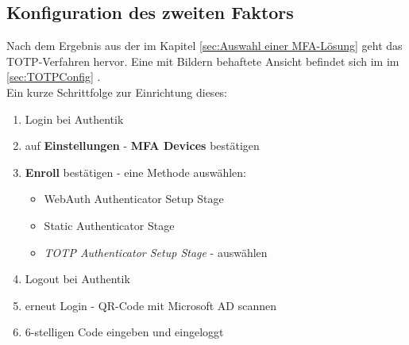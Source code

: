 \subsection{Konfiguration des zweiten Faktors}
\label{sec:Konfiguration des zweiten Faktors}
Nach dem Ergebnis aus der  im Kapitel \ref{sec:Auswahl einer MFA-Lösung}  
geht das \acs{TOTP}-Verfahren hervor. Eine mit Bildern behaftete Ansicht befindet sich im  im \ref{sec:TOTPConfig} 
.
\\Ein kurze Schrittfolge zur Einrichtung dieses:
\begin{enumerate}
    \item Login bei Authentik
    \item auf \textbf{Einstellungen} - \textbf{\acs*{MFA} Devices} bestätigen
    \item \textbf{Enroll} bestätigen - eine Methode auswählen:
    \begin{itemize}
        \item WebAuth Authenticator Setup Stage
        \item Static Authenticator Stage
        \item \textit{TOTP Authenticator Setup Stage} - auswählen
    \end{itemize}
   \item Logout bei Authentik
   \item erneut Login - QR-Code mit Microsoft AD scannen
   \item 6-stelligen Code eingeben und eingeloggt
\end{enumerate}